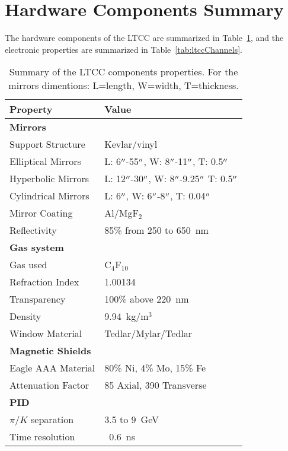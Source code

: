 \section{Hardware Components Summary}

The hardware components of the LTCC are summarized in Table~\ref{tab:ltccProperties}, and the electronic properties
are summarized in Table~\ref{tab:ltccChannels}.

\begin{table}[h]
    \small
	\begin{center}
		\begin{tabular}{| l | l |}
			\hline \hline
			Property                 & Value \\
			\hline
			{\bf Mirrors}            &                               \\
			Support Structure        & Kevlar/vinyl                  \\
			Elliptical Mirrors       & L: 6$^{\prime\prime}$-55$^{\prime\prime}$,  W: 8$^{\prime\prime}$-11$^{\prime\prime}$,  T: 0.5$^{\prime\prime}$     \\
			Hyperbolic Mirrors       & L: 12$^{\prime\prime}$-30$^{\prime\prime}$, W: 8$^{\prime\prime}$-9.25$^{\prime\prime}$ T: 0.5$^{\prime\prime}$  \\
            Cylindrical Mirrors      & L: 6$^{\prime\prime}$, W: 6$^{\prime\prime}$-8$^{\prime\prime}$, T: 0.04$^{\prime\prime}$   \\
			Mirror Coating           & Al/MgF$_2$                    \\
			Reflectivity             & 85\% from 250 to 650~nm       \\
			{\bf Gas system}         &                               \\
			Gas used                 &   C$_4$F$_{10}$                 \\
			Refraction Index         & 1.00134                       \\
			Transparency             & 100\% above 220~nm            \\
			Density                  & 9.94~kg/m$^3$                 \\
			Window Material          & Tedlar/Mylar/Tedlar           \\
			{\bf Magnetic Shields}   &                               \\
			Eagle AAA Material       & 80\% Ni, 4\% Mo, 15\% Fe      \\
			Attenuation Factor       &  85 Axial, 390 Transverse     \\
			{\bf PID}                &                               \\
			$\pi/K$ separation       &  3.5 to 9~GeV               \\
			Time resolution          &  ~0.6~ns                      \\
			\hline \hline
		\end{tabular}
	\end{center}
        \caption{Summary of the LTCC components properties. For the mirrors dimentions: L=length, W=width, T=thickness.}
        \label{tab:ltccProperties}
\end{table}

